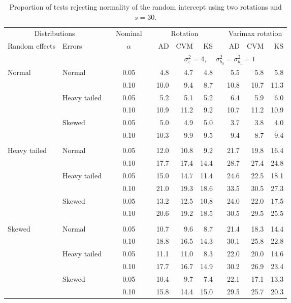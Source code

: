 \begin{table}[ht]
\centering
\caption{\label{tab:fixedsimb030} Proportion of tests rejecting normality of the random intercept using two rotations and $s = 30$.}
\begin{scriptsize}
\begin{tabular}{ll p{.1cm} c p{.1cm} rrr p{.1cm} rrr}
  \hline
  \multicolumn{2}{c}{Distributions}& & Nominal & &  \multicolumn{3}{c}{Rotation} & & \multicolumn{3}{c}{Varimax rotation} \\ \cline{1-2} \cline{6-8} \cline{10-12}   
  Random effects & Errors & & $\alpha$ & & AD & CVM & KS & & AD & CVM & KS \\ 
   \hline
& && && \multicolumn{7}{c}{$\sigma_{\varepsilon}^2 = 4$, \ \ $\sigma_{b_0}^2 = \sigma_{b_1}^2 = 1$} \\ \cline{6-12}
\rowcolor{gray!20} Normal & Normal &  & 0.05 &  & 4.8 & 4.7 & 4.8 &  & 5.5 & 5.8 & 5.8 \\ 
\rowcolor{gray!20}    &  &  & 0.10 &  & 10.0 & 9.4 & 8.7 &  & 10.8 & 10.7 & 11.3 \\ 
\rowcolor{gray!20}    & Heavy tailed &  & 0.05 &  & 5.2 & 5.1 & 5.2 &  & 6.4 & 5.9 & 6.0 \\ 
\rowcolor{gray!20}    &  &  & 0.10 &  & 10.9 & 11.2 & 9.2 &  & 10.7 & 11.2 & 10.9 \\ 
\rowcolor{gray!20}    & Skewed &  & 0.05 &  & 5.0 & 4.9 & 5.0 &  & 3.7 & 3.8 & 4.0 \\ 
\rowcolor{gray!20}    &  &  & 0.10 &  & 10.3 & 9.9 & 9.5 &  & 9.4 & 8.7 & 9.4 \\ 
&&&&&&&&&&&\\
  Heavy tailed & Normal &  & 0.05 &  & 12.0 & 10.8 & 9.2 &  & 21.7 & 19.8 & 16.4 \\ 
   &  &  & 0.10 &  & 17.7 & 17.4 & 14.4 &  & 28.7 & 27.4 & 24.8 \\ 
   & Heavy tailed &  & 0.05 &  & 15.0 & 14.7 & 11.4 &  & 24.6 & 22.5 & 18.1 \\ 
   &  &  & 0.10 &  & 21.0 & 19.3 & 18.6 &  & 33.5 & 30.5 & 27.3 \\ 
   & Skewed &  & 0.05 &  & 13.2 & 12.5 & 10.8 &  & 24.0 & 22.0 & 17.5 \\ 
   &  &  & 0.10 &  & 20.6 & 19.2 & 18.5 &  & 30.5 & 29.5 & 25.5 \\ 
&&&&&&&&&&&\\   
  Skewed & Normal &  & 0.05 &  & 10.7 & 9.6 & 8.7 &  & 21.4 & 18.3 & 14.4 \\ 
   &  &  & 0.10 &  & 18.8 & 16.5 & 14.3 &  & 30.1 & 25.8 & 22.8 \\ 
   & Heavy tailed &  & 0.05 &  & 11.1 & 11.0 & 8.3 &  & 22.0 & 20.0 & 14.6 \\ 
   &  &  & 0.10 &  & 17.7 & 16.7 & 14.9 &  & 30.2 & 26.9 & 23.4 \\ 
   & Skewed &  & 0.05 &  & 10.4 & 9.7 & 7.4 &  & 22.1 & 17.1 & 13.3 \\ 
   &  &  & 0.10 &  & 15.8 & 14.4 & 15.0 &  & 29.5 & 25.7 & 20.3 \\ 


\end{tabular}
\end{scriptsize}
\end{table}
